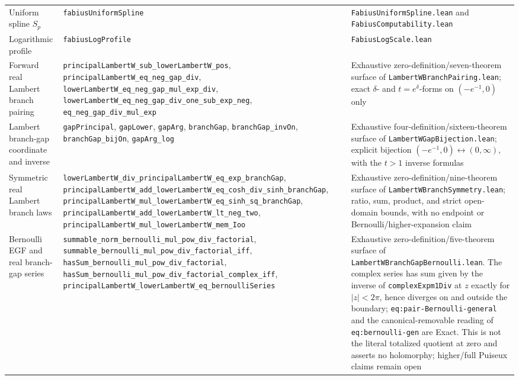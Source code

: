 \documentclass[11pt,oneside]{article}
\theoremstyle{definition}
\theoremstyle{remark}
\begin{document}
\begin{longtable}{@{}>{\raggedright\arraybackslash}p{} >{\raggedright\arraybackslash}p{} >{\raggedright\arraybackslash}p{}@{}}
Uniform spline \(S_p\) & \nolinkurl{fabiusUniformSpline} & \nolinkurl{FabiusUniformSpline.lean} and \nolinkurl{FabiusComputability.lean} \\
Logarithmic profile & \nolinkurl{fabiusLogProfile} & \nolinkurl{FabiusLogScale.lean} \\
Forward real Lambert branch pairing & \nolinkurl{principalLambertW_sub_lowerLambertW_pos}, \nolinkurl{principalLambertW_eq_neg_gap_div}, \nolinkurl{lowerLambertW_eq_neg_gap_mul_exp_div}, \nolinkurl{lowerLambertW_eq_neg_gap_div_one_sub_exp_neg}, \nolinkurl{eq_neg_gap_div_mul_exp} & Exhaustive zero-definition/seven-theorem surface of \nolinkurl{LambertWBranchPairing.lean}; exact \(\delta\)- and \(t=e^\delta\)-forms on \((-e^{-1},0)\) only \\
Lambert branch-gap coordinate and inverse & \nolinkurl{gapPrincipal}, \nolinkurl{gapLower}, \nolinkurl{gapArg}, \nolinkurl{branchGap}, \nolinkurl{branchGap_invOn}, \nolinkurl{branchGap_bijOn}, \nolinkurl{gapArg_log} & Exhaustive four-definition/sixteen-theorem surface of \nolinkurl{LambertWGapBijection.lean}; explicit bijection \((-e^{-1},0)\leftrightarrow(0,\infty)\), with the \(t>1\) inverse formulas \\
Symmetric real Lambert branch laws & \nolinkurl{lowerLambertW_div_principalLambertW_eq_exp_branchGap}, \nolinkurl{principalLambertW_add_lowerLambertW_eq_cosh_div_sinh_branchGap}, \nolinkurl{principalLambertW_mul_lowerLambertW_eq_sinh_sq_branchGap}, \nolinkurl{principalLambertW_add_lowerLambertW_lt_neg_two}, \nolinkurl{principalLambertW_mul_lowerLambertW_mem_Ioo} & Exhaustive zero-definition/nine-theorem surface of \nolinkurl{LambertWBranchSymmetry.lean}; ratio, sum, product, and strict open-domain bounds, with no endpoint or Bernoulli/higher-expansion claim \\
Bernoulli EGF and real branch-gap series & \nolinkurl{summable_norm_bernoulli_mul_pow_div_factorial}, \nolinkurl{summable_bernoulli_mul_pow_div_factorial_iff}, \nolinkurl{hasSum_bernoulli_mul_pow_div_factorial}, \nolinkurl{hasSum_bernoulli_mul_pow_div_factorial_complex_iff}, \nolinkurl{principalLambertW_lowerLambertW_eq_bernoulliSeries} & Exhaustive zero-definition/five-theorem surface of \nolinkurl{LambertWBranchGapBernoulli.lean}.  The complex series has sum given by the inverse of \nolinkurl{complexExpm1Div} at \(z\) exactly for \(\lvert z\rvert<2\pi\), hence diverges on and outside the boundary; \nolinkurl{eq:pair-Bernoulli-general} and the canonical-removable reading of \nolinkurl{eq:bernoulli-gen} are Exact.  This is not the literal totalized quotient at zero and asserts no holomorphy; higher/full Puiseux claims remain open \\

\end{longtable}
\end{document}
